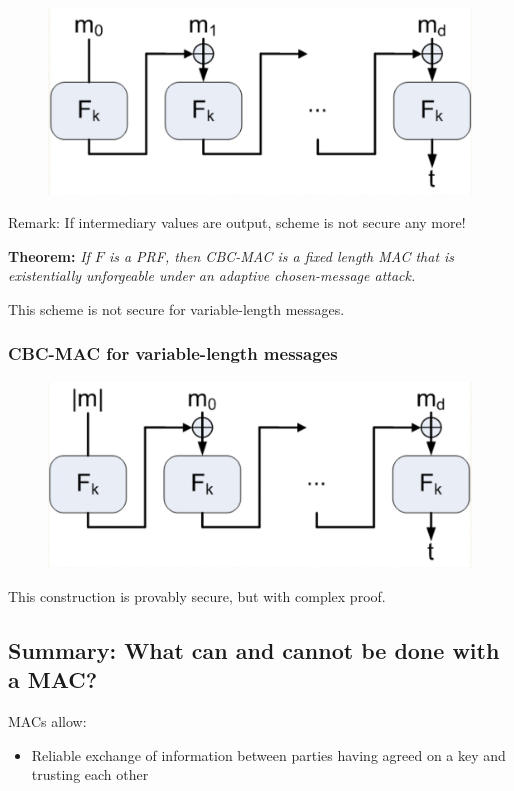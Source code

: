 \documentclass[12pt]{article}
\begin{document}
\begin{figure}[ht]
    \centering
    \includegraphics[width=12cm]{figures/f1.png}
\end{figure}
Remark: If intermediary values are output, scheme is not secure any more!

\textbf{Theorem:} \emph{If $F$ is a PRF, then CBC-MAC is a fixed length MAC that is existentially unforgeable under an adaptive chosen-message attack.}

This scheme is not secure for variable-length messages.

\subsubsection{CBC-MAC for variable-length messages}

\begin{figure}[ht]
    \centering
    \includegraphics[width=12cm]{figures/f2.png}
\end{figure}
This construction is provably secure, but with complex proof.
\newpage
\subsection{Summary: What can and cannot be done with a MAC?}
MACs allow:\begin{itemize}
\item Reliable exchange of information between parties having agreed on a key and trusting each other 
\end{itemize}
\end{document}
